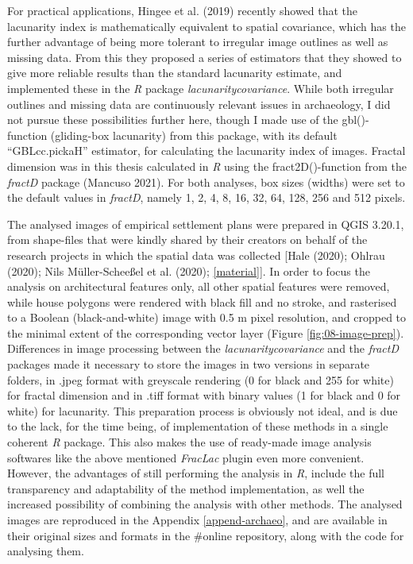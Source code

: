 \documentclass[
  12pt,
  a4paper, twoside]{book}
\begin{document}
For practical applications, Hingee et al. (2019) recently showed that the lacunarity index is mathematically equivalent to spatial covariance, which has the further advantage of being more tolerant to irregular image outlines as well as missing data. From this they proposed a series of estimators that they showed to give more reliable results than the standard lacunarity estimate, and implemented these in the \emph{R} package \emph{lacunaritycovariance}. While both irregular outlines and missing data are continuously relevant issues in archaeology, I did not pursue these possibilities further here, though I made use of the gbl()-function (gliding-box lacunarity) from this package, with its default ``GBLcc.pickaH'' estimator, for calculating the lacunarity index of images. Fractal dimension was in this thesis calculated in \emph{R} using the fract2D()-function from the \emph{fractD} package (Mancuso 2021). For both analyses, box sizes (widths) were set to the default values in \emph{fractD}, namely 1, 2, 4, 8, 16, 32, 64, 128, 256 and 512 pixels.

The analysed images of empirical settlement plans were prepared in QGIS 3.20.1, from shape-files that were kindly shared by their creators on behalf of the research projects in which the spatial data was collected {[}Hale (2020); Ohlrau (2020); Nils Müller-Scheeßel et al. (2020); \ref{material}{]}. In order to focus the analysis on architectural features only, all other spatial features were removed, while house polygons were rendered with black fill and no stroke, and rasterised to a Boolean (black-and-white) image with 0.5 m pixel resolution, and cropped to the minimal extent of the corresponding vector layer (Figure \ref{fig:08-image-prep}). Differences in image processing between the \emph{lacunaritycovariance} and the \emph{fractD} packages made it necessary to store the images in two versions in separate folders, in .jpeg format with greyscale rendering (0 for black and 255 for white) for fractal dimension and in .tiff format with binary values (1 for black and 0 for white) for lacunarity. This preparation process is obviously not ideal, and is due to the lack, for the time being, of implementation of these methods in a single coherent \emph{R} package. This also makes the use of ready-made image analysis softwares like the above mentioned \emph{FracLac} plugin even more convenient. However, the advantages of still performing the analysis in \emph{R}, include the full transparency and adaptability of the method implementation, as well the increased possibility of combining the analysis with other methods. The analysed images are reproduced in the Appendix \ref{append-archaeo}, and are available in their original sizes and formats in the \#online repository, along with the code for analysing them.
\end{document}
